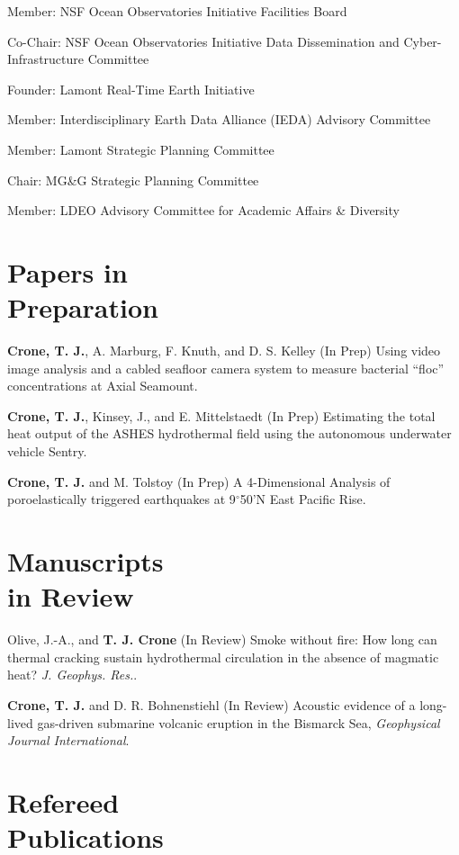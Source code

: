 \documentclass[11pt]{res}
\begin{document}
\begin{resume}
Member: NSF Ocean Observatories Initiative Facilities Board

Co-Chair: NSF Ocean Observatories Initiative Data Dissemination and Cyber-Infrastructure Committee

Founder: Lamont Real-Time Earth Initiative

Member: Interdisciplinary Earth Data Alliance (IEDA) Advisory Committee

Member: Lamont Strategic Planning Committee

Chair: MG\&G Strategic Planning Committee

Member: LDEO Advisory Committee for Academic Affairs \& Diversity
\vspace{0.2in}

\section{\sc Papers in\\Preparation}

{\bf Crone, T. J.}, A. Marburg, F. Knuth, and D. S. Kelley (In Prep) Using video image analysis and a cabled seafloor camera system to measure bacterial ``floc'' concentrations at Axial Seamount.

{\bf Crone, T. J.}, Kinsey, J., and E. Mittelstaedt (In Prep) Estimating the total heat output of the ASHES hydrothermal field using the autonomous underwater vehicle Sentry.

{\bf Crone, T. J.} and M. Tolstoy (In Prep) A 4-Dimensional Analysis of poroelastically triggered earthquakes at 9$^\circ$50'N East Pacific Rise.

\section{\sc Manuscripts\\in Review}

Olive, J.-A., and {\bf T. J. Crone} (In Review) Smoke without fire: How long can thermal cracking sustain hydrothermal circulation in the absence of magmatic heat? {\em J. Geophys. Res.}.

{\bf Crone, T. J.} and D. R. Bohnenstiehl (In Review) Acoustic evidence of a long-lived gas-driven submarine volcanic eruption in the Bismarck Sea, {\em Geophysical Journal International}.

\section{\sc Refereed\\Publications}


\end{resume}
\end{document}
